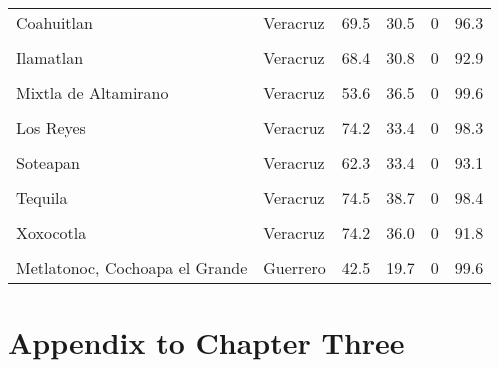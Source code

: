 \documentclass[
]{report}
\begin{document}
\begin{longtable}[t]{llrrrr}
Coahuitlan & Veracruz & 69.5 & 30.5 & 0 & 96.3\\
\cellcolor{gray!6}{Filomeno Mata} & \cellcolor{gray!6}{Veracruz} & \cellcolor{gray!6}{61.9} & \cellcolor{gray!6}{31.9} & \cellcolor{gray!6}{0} & \cellcolor{gray!6}{98.3}\\
Ilamatlan & Veracruz & 68.4 & 30.8 & 0 & 92.9\\
\addlinespace
\cellcolor{gray!6}{Mecatlan} & \cellcolor{gray!6}{Veracruz} & \cellcolor{gray!6}{71.6} & \cellcolor{gray!6}{28.0} & \cellcolor{gray!6}{0} & \cellcolor{gray!6}{98.7}\\
Mixtla de Altamirano & Veracruz & 53.6 & 36.5 & 0 & 99.6\\
\cellcolor{gray!6}{Pajapan} & \cellcolor{gray!6}{Veracruz} & \cellcolor{gray!6}{73.6} & \cellcolor{gray!6}{41.7} & \cellcolor{gray!6}{0} & \cellcolor{gray!6}{90.8}\\
Los Reyes & Veracruz & 74.2 & 33.4 & 0 & 98.3\\
\cellcolor{gray!6}{Soledad Atzompa} & \cellcolor{gray!6}{Veracruz} & \cellcolor{gray!6}{66.7} & \cellcolor{gray!6}{32.8} & \cellcolor{gray!6}{0} & \cellcolor{gray!6}{98.2}\\
\addlinespace
Soteapan & Veracruz & 62.3 & 33.4 & 0 & 93.1\\
\cellcolor{gray!6}{Tehuipango} & \cellcolor{gray!6}{Veracruz} & \cellcolor{gray!6}{40.5} & \cellcolor{gray!6}{27.8} & \cellcolor{gray!6}{0} & \cellcolor{gray!6}{99.6}\\
Tequila & Veracruz & 74.5 & 38.7 & 0 & 98.4\\
\cellcolor{gray!6}{Texcatepec} & \cellcolor{gray!6}{Veracruz} & \cellcolor{gray!6}{68.4} & \cellcolor{gray!6}{28.0} & \cellcolor{gray!6}{0} & \cellcolor{gray!6}{84.8}\\
Xoxocotla & Veracruz & 74.2 & 36.0 & 0 & 91.8\\
\addlinespace
\cellcolor{gray!6}{Zontecomatlan de Lopez y Fuentes} & \cellcolor{gray!6}{Veracruz} & \cellcolor{gray!6}{74.8} & \cellcolor{gray!6}{22.2} & \cellcolor{gray!6}{0} & \cellcolor{gray!6}{90.9}\\
Metlatonoc, Cochoapa el Grande & Guerrero & 42.5 & 19.7 & 0 & 99.6\\*
\end{longtable}
\endgroup{}

\hypertarget{appendix-to-chapter-three}{%
\chapter{Appendix to Chapter Three}\label{appendix-to-chapter-three}}
\end{document}
